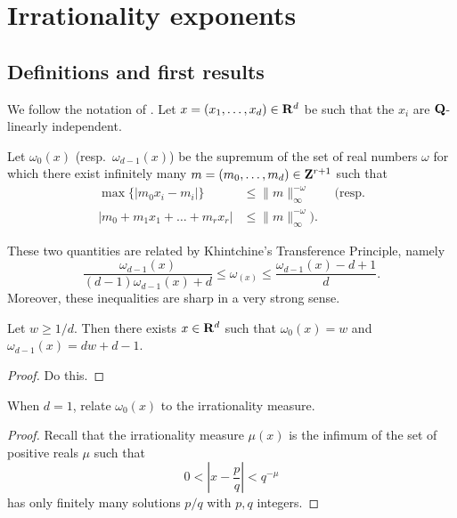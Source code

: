 
\chapter{Irrationality exponents}





\section{Definitions and first results}

We follow the notation of \cite{laurent-2009}. Let 
$x=(x_1,\dots,x_d)\in \mathbf{R}^d$ be such that the $x_i$ are $\mathbf{Q}$-linearly 
independent. 

\begin{definition}\label{def:approx-exp}
Let $\omega_0(x)$ (resp.~$\omega_{d-1}(x)$) be the supremum of the set of real 
numbers $\omega$ for which there exist infinitely many 
$m=(m_0,\dots,m_d)\in \mathbf{Z}^{r+1}$ such that 
\begin{align*}
	\max\{|m_0 x_i - m_i|\} 
		&\leqslant \|m\|_\infty^{-\omega}  \qquad\text{(resp.} \\
	|m_0 + m_1 x_1 + \dots + m_r x_r| 
		&\leqslant \|m\|_\infty^{-\omega} \text{).}
\end{align*}
\end{definition}

These two quantities are related by Khintchine's Transference Principle, namely 
\[
	\frac{\omega_{d-1}(x)}{(d-1) \omega_{d-1}(x)+d} \leqslant \omega_(x) \leqslant \frac{\omega_{d-1}(x)-d+1}{d} .
\]
Moreover, these inequalities are sharp in a very strong sense. 

\begin{theorem}[Jarn\'ik]\label{thm:jarnik}
Let $w\geqslant 1/d$. Then there exists $x\in \mathbf{R}^d$ such that $\omega_0(x)=w$ 
and $\omega_{d-1}(x) = d w+d-1$. 
\end{theorem}
\begin{proof}
Do this. 
\end{proof}

\begin{theorem}
When $d=1$, relate $\omega_0(x)$ to the irrationality measure. 
\end{theorem}
\begin{proof}
Recall that the irrationality measure $\mu(x)$ is the infimum of the set of 
positive reals $\mu$ such that 
\[
	0 < \left| x - \frac p q\right| < q^{-\mu} 
\]
has only finitely many solutions $p/q$ with $p,q$ integers. 
\end{proof}

